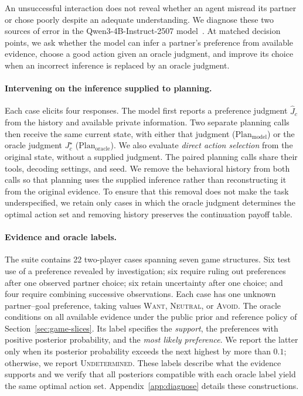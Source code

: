 \label{sec:diagnose}

An unsuccessful interaction does not reveal whether an agent misread its
partner or chose poorly despite an adequate understanding. We diagnose these
two sources of error in the
Qwen3-4B-Instruct-2507 model~\citep{yang2025qwen3}. At matched decision points,
we ask whether the model can infer a partner's preference from available
evidence, choose a good action given an oracle judgment, and improve its
choice when an incorrect inference is replaced by an oracle judgment.

\paragraph{Intervening on the inference supplied to planning.}
Each case elicits four responses. The model first reports a preference
judgment $\widehat J_c$ from the history and available private information.
Two separate planning calls then receive the same current state, with either
that judgment ($\mathrm{Plan}_{\mathrm{model}}$) or the oracle judgment $J_c^\star$
($\mathrm{Plan}_{\mathrm{oracle}}$). We also evaluate \emph{direct action selection} from the
original state, without a supplied judgment. The paired planning calls
share their tools, decoding settings, and seed. We remove the behavioral history from both calls so that planning
uses the supplied inference rather than reconstructing it from the original
evidence. To ensure that this removal does not make the task underspecified,
we retain only cases in which the oracle judgment determines the optimal
action set and removing history preserves the continuation payoff table.

\paragraph{Evidence and oracle labels.}
The suite contains 22 two-player cases spanning seven game structures.
Six test use of a preference revealed by investigation; six require ruling
out preferences after one observed partner choice; six retain uncertainty
after one choice; and four require combining successive observations.
Each case has one unknown partner--goal preference, taking values
\textsc{Want}, \textsc{Neutral}, or \textsc{Avoid}. The oracle conditions on
all available evidence under the public prior and reference policy of
Section~\ref{sec:game-slices}. Its label specifies the \emph{support}, the
preferences with positive posterior probability, and the \emph{most likely
preference}. We report the latter only when its posterior probability
exceeds the next highest by more than $0.1$; otherwise, we report
\textsc{Undetermined}. These labels describe what the evidence
supports and we verify
that all posteriors compatible with each oracle label yield the same optimal
action set. Appendix~\ref{app:diagnose} details these constructions.

